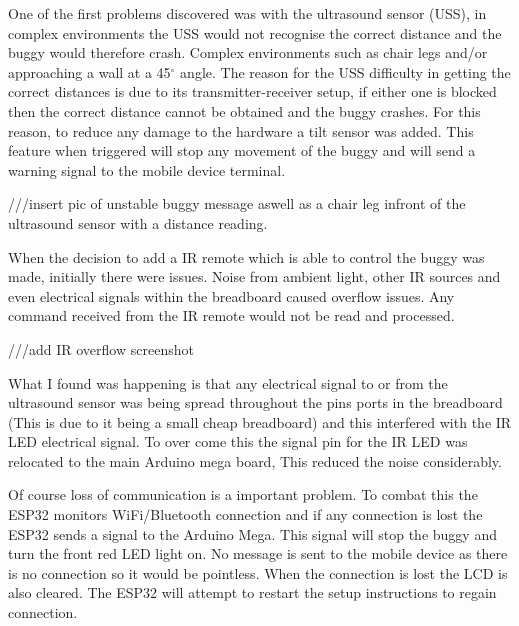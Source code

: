 \documentclass[8pt, a4paper]{article}
\begin{document}
One of the first problems discovered was with the ultrasound sensor (USS), in complex environments the USS would not recognise the correct distance and the buggy would therefore crash. Complex environments such as chair legs and/or approaching a wall at a 45$^{\circ}$ angle. The reason for the USS difficulty in getting the correct distances is due to its transmitter-receiver setup, if either one is blocked then the correct distance cannot be obtained and the buggy crashes. For this reason, to reduce any damage to the hardware a tilt sensor was added. This feature when triggered will stop any movement of the buggy and will send a warning signal to the mobile device terminal. 

///insert pic of unstable buggy message aswell as a chair leg infront of the ultrasound sensor with a distance reading. 

 
When the decision to add a IR remote which is able to control the buggy was made, initially there were issues. Noise from ambient light, other IR sources and even electrical signals within the breadboard caused overflow issues. Any command received from the IR remote would not be read and processed. 

///add IR overflow screenshot 

What I found was happening is that any electrical signal to or from the ultrasound sensor was being spread throughout the pins ports in the breadboard (This is due to it being a small cheap breadboard) and this interfered with the IR LED electrical signal. To over come this the signal pin for the IR LED was relocated to the main Arduino mega board, This reduced the noise considerably.  


Of course loss of communication is a important problem. To combat this the ESP32 monitors WiFi/Bluetooth connection and if any connection is lost the ESP32 sends a signal to the Arduino Mega. This signal will stop the buggy and turn the front red LED light on. No message is sent to the mobile device as there is no connection so it would be pointless. When the connection is lost the LCD is also cleared. The ESP32 will attempt to restart the setup instructions to regain connection. 
\end{document}
